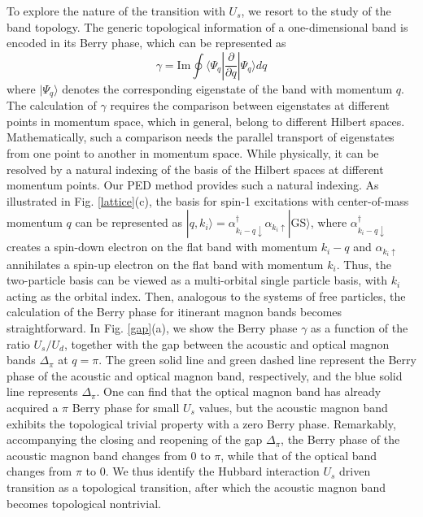 \documentclass[amsmath,superscriptaddress,showpacs,aps,prb,twocolumn]{revtex4-1}
\begin{document}
\par To explore the nature of the transition with $U_s$, we resort to the study of the band topology. The generic topological information of a one-dimensional band is encoded in its Berry phase, which can be represented as
\begin{equation}
\gamma=\text{Im}\oint\langle \Psi_q|\frac{\partial}{\partial q}|\Psi_q\rangle dq
\end{equation}
where $|\Psi_q\rangle$ denotes the corresponding eigenstate of the band with momentum $q$. The calculation of $\gamma$ requires the comparison between eigenstates at different points in momentum space, which in general, belong to different Hilbert spaces. Mathematically, such a comparison needs the parallel transport of eigenstates from one point to another in momentum space. While physically, it can be resolved by a natural indexing of the basis of the Hilbert spaces at different momentum points. Our PED method provides such a natural indexing. As illustrated in Fig. \ref{lattice}(c), the basis for spin-1 excitations with center-of-mass momentum $q$ can be represented as $|q,k_i\rangle=\alpha_{k_i-q\downarrow}^\dagger\alpha_{k_i\uparrow}|\text{GS}\rangle$, where $\alpha_{k_i-q\downarrow}^\dagger$ creates a spin-down electron on the flat band with momentum $k_i-q$ and $\alpha_{k_i\uparrow}$ annihilates a spin-up electron on the flat band with momentum $k_i$. Thus, the two-particle basis can be viewed as a multi-orbital single particle basis, with $k_i$ acting as the orbital index. Then, analogous to the systems of free particles, the calculation of the Berry phase for itinerant magnon bands becomes straightforward. In Fig. \ref{gap}(a), we show the Berry phase $\gamma$ as a function of the ratio $U_s/U_d$, together with the gap between the acoustic and optical magnon bands $\Delta_\pi$ at $q=\pi$. The green solid line and green dashed line represent the Berry phase of the acoustic and optical magnon band, respectively, and the blue solid line represents $\Delta_\pi$. One can find that the optical magnon band has already acquired a $\pi$  Berry phase for small $U_s$ values, but the acoustic magnon band exhibits the topological trivial property with a zero Berry phase. Remarkably, accompanying the closing and reopening of the gap $\Delta_\pi$, the Berry phase of the acoustic magnon band changes from $0$ to $\pi$, while that of the optical band changes from $\pi$ to $0$. We thus identify the Hubbard interaction $U_s$ driven transition as a topological transition, after which the acoustic magnon band becomes topological nontrivial.
\end{document}
